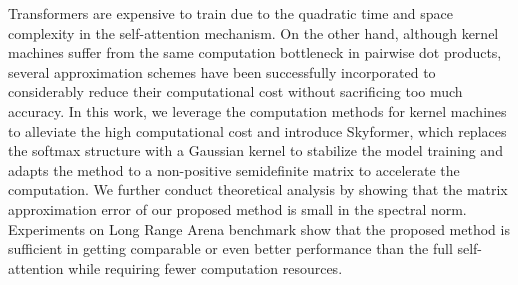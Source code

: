 

Transformers are expensive to train due to the quadratic time and space complexity in the self-attention mechanism. On the other hand, although kernel machines suffer from the same computation bottleneck in pairwise dot products, several approximation schemes have been successfully incorporated to considerably reduce their computational cost without sacrificing too much accuracy. In this work, we leverage the computation methods for kernel machines to alleviate the high computational cost and introduce Skyformer, which replaces the softmax structure with a Gaussian kernel to stabilize the model training and adapts the \nystrom method to a  non-positive semidefinite matrix to accelerate the computation. We further conduct theoretical analysis by showing that the matrix approximation error of our proposed method is small in the spectral norm. Experiments on Long Range Arena benchmark show that the proposed method is sufficient in getting comparable or even better performance than the full self-attention while requiring fewer computation resources. 

